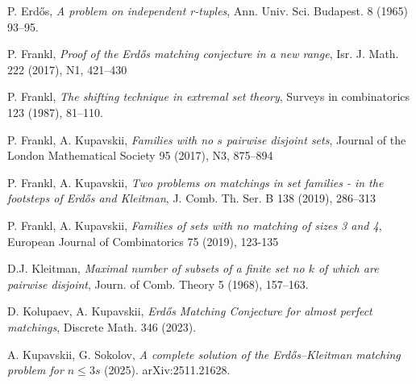 \documentclass[12pt,a4paper]{article}
\begin{document}
    
	\begin{thebibliography}{}
     P. Erd\H os, \textit{A problem on independent r-tuples}, Ann. Univ. Sci. Budapest. 8 (1965) 93--95.

		P. Frankl, {\it Proof of the Erd\H os matching conjecture in a new range}, Isr. J. Math.
		222 (2017), N1, 421--430
		
		P. Frankl, {\it The shifting technique in extremal set theory}, Surveys in combinatorics 123 (1987), 81--110.

 P. Frankl, A. Kupavskii,  {\it Families with no $s$ pairwise disjoint sets}, Journal of the London Mathematical Society 95 (2017), N3, 875--894

 P. Frankl, A. Kupavskii, {\it Two problems on matchings in set families - in the footsteps of Erd\H os and Kleitman}, J. Comb. Th. Ser. B 138 (2019),  286--313

 P. Frankl, A. Kupavskii, \textit{Families of sets with no matching of sizes 3 and 4}, European Journal of Combinatorics 75 (2019), 123-135

		
 D.J. Kleitman, \textit{Maximal number of subsets of a finite set no $k$ of which are pairwise disjoint}, Journ. of Comb. Theory 5 (1968), 157--163.
		
 D. Kolupaev, A. Kupavskii, {\it Erd\H os Matching Conjecture for almost perfect matchings}, Discrete Math. 346 (2023).

 A. Kupavskii, G. Sokolov, {\it A complete solution of the Erd\H os--Kleitman matching problem for $n\le 3s$} (2025). arXiv:2511.21628.

	\end{thebibliography}
	
\end{document}
